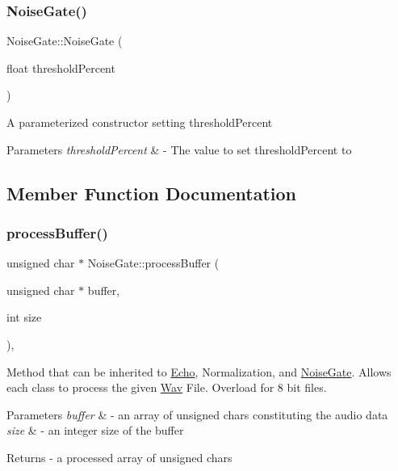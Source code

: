 \subsubsection{\texorpdfstring{Noise\+Gate()}{NoiseGate()}}
{\footnotesize\ttfamily Noise\+Gate\+::\+Noise\+Gate (\begin{DoxyParamCaption}\item[{float}]{threshold\+Percent }\end{DoxyParamCaption})}

A parameterized constructor setting threshold\+Percent 
\begin{DoxyParams}{Parameters}
{\em threshold\+Percent} & -\/ The value to set threshold\+Percent to \\
\hline
\end{DoxyParams}


\subsection{Member Function Documentation}
\mbox{\label{classNoiseGate_a820117e917acd9cdc55e5f4ee46b9231}} 
\subsubsection{\texorpdfstring{process\+Buffer()}{processBuffer()}\hspace{0.1cm}{\footnotesize\ttfamily [1/2]}}
{\footnotesize\ttfamily unsigned char $\ast$ Noise\+Gate\+::process\+Buffer (\begin{DoxyParamCaption}\item[{unsigned char $\ast$}]{buffer,  }\item[{int}]{size }\end{DoxyParamCaption})\hspace{0.3cm}{\ttfamily [override]}, {\ttfamily [virtual]}}

Method that can be inherited to \hyperlink{classEcho}{Echo}, Normalization, and \hyperlink{classNoiseGate}{Noise\+Gate}. Allows each class to process the given \hyperlink{classWav}{Wav} File. Overload for 8 bit files. 
\begin{DoxyParams}{Parameters}
{\em buffer} & -\/ an array of unsigned chars constituting the audio data \\
\hline
{\em size} & -\/ an integer size of the buffer \\
\hline
\end{DoxyParams}
\begin{DoxyReturn}{Returns}
-\/ a processed array of unsigned chars 
\end{DoxyReturn}


